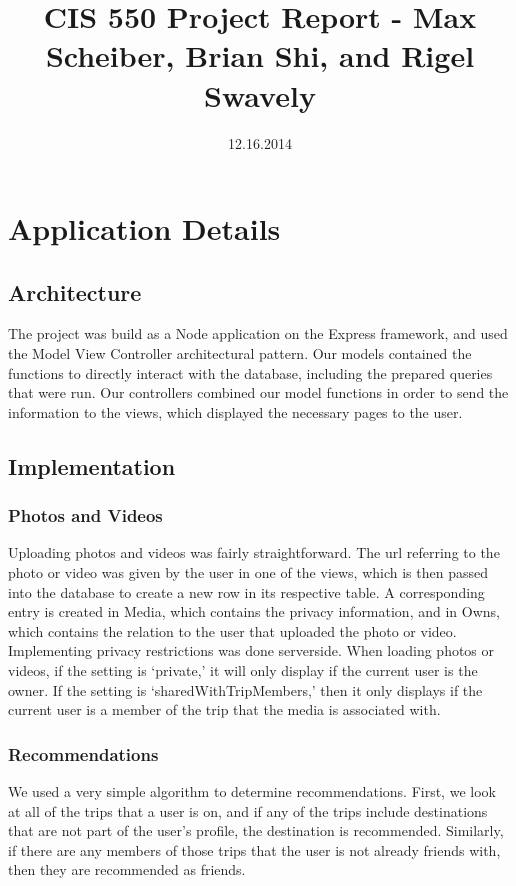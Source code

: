 \documentclass[11pt]{amsart}
\title{CIS 550 Project Report - Max Scheiber, Brian Shi, and Rigel Swavely}
\date{12.16.2014}
\begin{document}
\maketitle
\section{Application Details}
\subsection{Architecture}
The project was build as a Node application on the Express framework, and used the Model View Controller 
architectural pattern. Our models contained the functions to directly interact with the database,
including the prepared queries that were run. Our controllers combined our model functions in order to 
send the information to the views, which displayed the necessary pages to the user. 
\subsection{Implementation}
\subsubsection{Photos and Videos}
Uploading photos and videos was fairly straightforward. The url referring to the photo or video was given by
the user in one of the views, which is then passed into the database to create a new row in its respective table.
A corresponding entry is created in Media, which contains the privacy information, and in Owns, which contains
the relation to the user that uploaded the photo or video.\\
Implementing privacy restrictions was done serverside. When loading photos or videos, if the setting is `private,'
it will only display if the current user is the owner. If the setting is `sharedWithTripMembers,' then it only displays
if the current user is a member of the trip that the media is associated with.
\subsubsection{Recommendations} We used a very simple algorithm to determine recommendations. First, we look at all of the
trips that a user is on, and if any of the trips include destinations that are not part of the user's profile, the destination
is recommended. Similarly, if there are any members of those trips that the user is not already friends with, then they are
recommended as friends.
\end{document}
